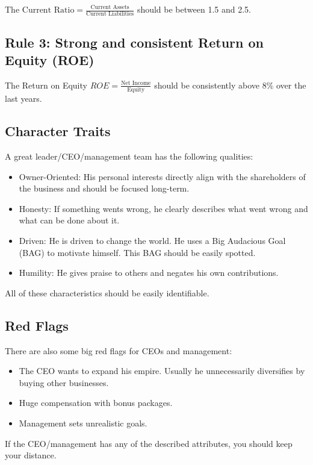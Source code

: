 The $\text{Current Ratio} = \frac{\text{Current Assets}}{\text{Current Liabilities}}$
should be between 1.5 and 2.5.

\subsection{Rule 3: Strong and consistent Return on Equity (ROE)}

The Return on Equity $ROE = \frac{\text{Net Income}}{\text{Equity}}$ should be
consistently above 8\% over the last years.

\subsection{Character Traits}

A great leader/CEO/management team has the following qualities:

\begin{itemize}
    \item Owner-Oriented: His personal interests directly align with the shareholders of the
          business and should be focused long-term.
    \item Honesty: If something wents wrong, he clearly describes what went wrong and what 
          can be done about it.
    \item Driven: He is driven to change the world. He uses a Big Audacious Goal (BAG) to
          motivate himself. This BAG should be easily spotted.
    \item Humility: He gives praise to others and negates his own contributions.
\end{itemize}
          
All of these characteristics should be easily identifiable.

\subsection{Red Flags}

There are also some big red flags for CEOs and management:

\begin{itemize}
    \item The CEO wants to expand his empire. Usually he unnecessarily diversifies by
buying other businesses.
    \item Huge compensation with bonus packages.
    \item Management sets unrealistic goals.
\end{itemize}

If the CEO/management has any of the described attributes, you should keep your distance.
